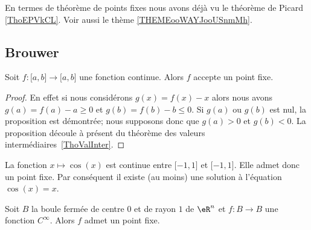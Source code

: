 En termes de théorème de points fixes nous avons déjà vu le théorème de Picard \ref{ThoEPVkCL}. Voir aussi le thème \ref{THEMEooWAYJooUSnmMh}.

\subsection{Brouwer}
\label{subSecZCCmMnQ}

\begin{proposition}
    Soit \( f\colon \mathopen[ a , b \mathclose]\to \mathopen[ a , b \mathclose]\) une fonction continue. Alors \( f\) accepte un point fixe.
\end{proposition}

\begin{proof}
    En effet si nous considérons \( g(x)=f(x)-x\) alors nous avons \( g(a)=f(a)-a\geq 0\) et \( g(b)=f(b)-b\leq 0\). Si \( g(a)\) ou \( g(b)\) est nul, la proposition est démontrée; nous supposons donc que \( g(a)>0\) et \( g(b)<0\). La proposition découle à présent du théorème des valeurs intermédiaires~\ref{ThoValInter}.
\end{proof}

\begin{example}
    La fonction \( x\mapsto\cos(x)\) est continue entre \( \mathopen[ -1 , 1 \mathclose]\) et \( \mathopen[ -1 , 1 \mathclose]\). Elle admet donc un point fixe. Par conséquent il existe (au moins) une solution à l'équation \( \cos(x)=x\).
\end{example}

\begin{proposition}     \label{PropDRpYwv}
    Soit \( B\) la boule fermée de centre \( 0\) et de rayon \( 1\) de \( \eR^n\) et \( f\colon B\to B\) une fonction \(  C^{\infty}\). Alors \( f\) admet un point fixe.
\end{proposition}

